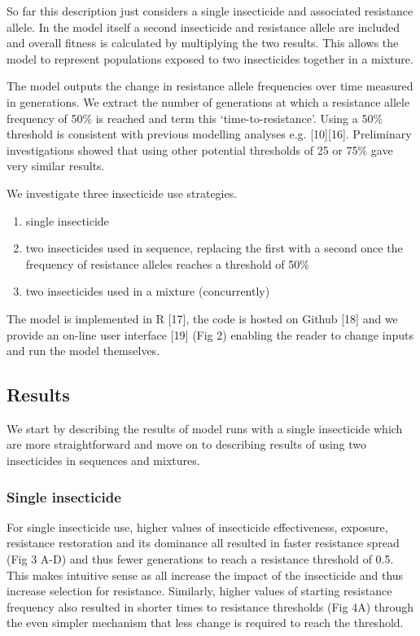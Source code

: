 \documentclass[11pt,]{article}
\providecommand{\tightlist}{%
  \setlength{\itemsep}{0pt}\setlength{\parskip}{0pt}}
\begin{document}
So far this description just considers a single insecticide and
associated resistance allele. In the model itself a second insecticide
and resistance allele are included and overall fitness is calculated by
multiplying the two results. This allows the model to represent
populations exposed to two insecticides together in a mixture.

The model outputs the change in resistance allele frequencies over time
measured in generations. We extract the number of generations at which a
resistance allele frequency of 50\% is reached and term this
`time-to-resistance'. Using a 50\% threshold is consistent with previous
modelling analyses e.g. {[}10{]}{[}16{]}. Preliminary investigations
showed that using other potential thresholds of 25 or 75\% gave very
similar results.

We investigate three insecticide use strategies.

\begin{enumerate}
\def\labelenumi{\arabic{enumi}.}
\tightlist
\item
  single insecticide
\item
  two insecticides used in sequence, replacing the first with a second
  once the frequency of resistance alleles reaches a threshold of 50\%
\item
  two insecticides used in a mixture (concurrently)
\end{enumerate}

The model is implemented in R {[}17{]}, the code is hosted on Github
{[}18{]} and we provide an on-line user interface {[}19{]} (Fig 2)
enabling the reader to change inputs and run the model themselves.

\subsection{Results}\label{results-1}

We start by describing the results of model runs with a single
insecticide which are more straightforward and move on to describing
results of using two insecticides in sequences and mixtures.

\subsubsection{Single insecticide}\label{single-insecticide}

For single insecticide use, higher values of insecticide effectiveness,
exposure, resistance restoration and its dominance all resulted in
faster resistance spread (Fig 3 A-D) and thus fewer generations to reach
a resistance threshold of 0.5. This makes intuitive sense as all
increase the impact of the insecticide and thus increase selection for
resistance. Similarly, higher values of starting resistance frequency
also resulted in shorter times to resistance thresholds (Fig 4A) through
the even simpler mechanism that less change is required to reach the
threshold.
\end{document}
